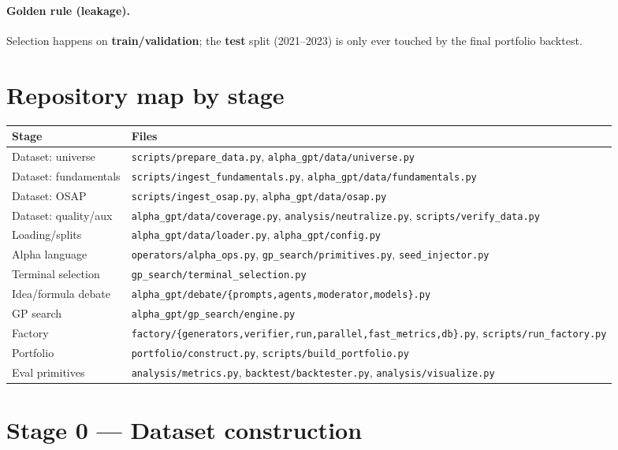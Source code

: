 \documentclass[11pt]{article}
\newcommand{\file}[1]{\texttt{#1}}
\begin{document}
\paragraph{Golden rule (leakage).} Selection happens on \textbf{train/validation};
the \textbf{test} split (2021--2023) is only ever touched by the final portfolio
backtest.

\section{Repository map by stage}

\begin{center}\small
\begin{tabular}{@{}ll@{}}
\toprule
\textbf{Stage} & \textbf{Files} \\
\midrule
Dataset: universe & \file{scripts/prepare\_data.py}, \file{alpha\_gpt/data/universe.py} \\
Dataset: fundamentals & \file{scripts/ingest\_fundamentals.py}, \file{alpha\_gpt/data/fundamentals.py} \\
Dataset: OSAP & \file{scripts/ingest\_osap.py}, \file{alpha\_gpt/data/osap.py} \\
Dataset: quality/aux & \file{alpha\_gpt/data/coverage.py}, \file{analysis/neutralize.py}, \file{scripts/verify\_data.py} \\
Loading/splits & \file{alpha\_gpt/data/loader.py}, \file{alpha\_gpt/config.py} \\
Alpha language & \file{operators/alpha\_ops.py}, \file{gp\_search/primitives.py}, \file{seed\_injector.py} \\
Terminal selection & \file{gp\_search/terminal\_selection.py} \\
Idea/formula debate & \file{alpha\_gpt/debate/\{prompts,agents,moderator,models\}.py} \\
GP search & \file{alpha\_gpt/gp\_search/engine.py} \\
Factory & \file{factory/\{generators,verifier,run,parallel,fast\_metrics,db\}.py}, \file{scripts/run\_factory.py} \\
Portfolio & \file{portfolio/construct.py}, \file{scripts/build\_portfolio.py} \\
Eval primitives & \file{analysis/metrics.py}, \file{backtest/backtester.py}, \file{analysis/visualize.py} \\
\bottomrule
\end{tabular}
\end{center}

\section{Stage 0 --- Dataset construction}
\end{document}
